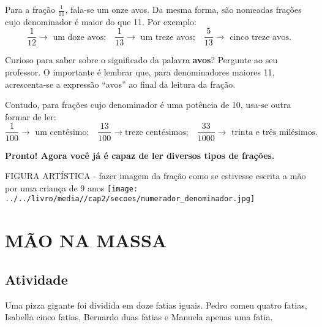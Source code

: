 Para a fração $\frac{1}{11}$, fala-se um onze avos. Da mesma forma, são nomeadas frações cujo denominador é maior do que 11. Por exemplo:
$$\frac{1}{12}\rightarrow \text{  um doze avos;}\quad \frac{1}{13}\rightarrow \text{ um treze avos;} \quad \frac{5}{13}\rightarrow \text{ cinco treze avos.}$$

Curioso para saber sobre o significado da palavra {\bf avos}? Pergunte ao seu professor. O importante é lembrar que, para denominadores maiores 11, acrescenta-se a expressão ``avos'' ao final da leitura da fração.

Contudo, para frações cujo denominador é uma potência de 10, usa-se outra formar de ler:
$$\frac{1}{100}\rightarrow \text{ um centésimo;}\quad \frac{13}{100} \rightarrow \text{treze centésimos;} \quad
\frac{33}{1000}\rightarrow \text{ trinta e três milésimos.}$$

{\bf Pronto! Agora você já é capaz de ler diversos tipos de frações.}

\begin{imagem*}[breakable]{}{}   FIGURA ARTÍSTICA - fazer imagem da fração como se estivesse escrita a mão por uma criança de 9 anos   \mbox{} \newline        \texttt{[image: ../../livro/media//cap2/secoes/numerador\_denominador.jpg]}   \end{imagem*}


\section{MÃO NA MASSA }

\subsection{Atividade}

Uma pizza gigante foi dividida em doze fatias iguais. 
Pedro comeu quatro fatias, Isabella cinco fatias, Bernardo duas fatias e Manuela apenas uma fatia.


